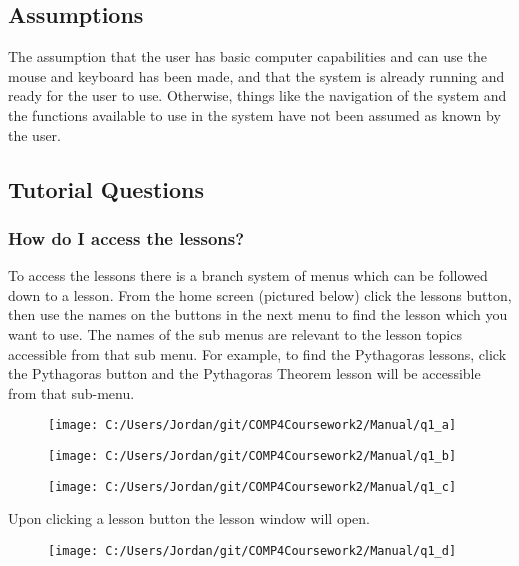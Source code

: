 \subsection{Assumptions}

The assumption that the user has basic computer capabilities and can use the mouse and keyboard has been made, and that the system is already running and ready for the user to use. Otherwise, things like the navigation of the system and the functions available to use in the system have not been assumed as known by the user.

\subsection{Tutorial Questions}

\subsubsection{How do I access the lessons?}

To access the lessons there is a branch system of menus which can be followed down to a lesson. From the home screen (pictured below) click the lessons button, then use the names on the buttons in the next menu to find the lesson which you want to use. The names of the sub menus are relevant to the lesson topics accessible from that sub menu. For example, to find the Pythagoras lessons, click the Pythagoras button and the Pythagoras Theorem lesson will be accessible from that sub-menu.

\begin{figure}[H]
    \texttt{[image: C:/Users/Jordan/git/COMP4Coursework2/Manual/q1\_a]}
\end{figure}

\begin{figure}[H]
    \texttt{[image: C:/Users/Jordan/git/COMP4Coursework2/Manual/q1\_b]}
\end{figure}

\begin{figure}[H]
    \texttt{[image: C:/Users/Jordan/git/COMP4Coursework2/Manual/q1\_c]}
\end{figure}

Upon clicking a lesson button the lesson window will open.

\begin{figure}[H]
    \texttt{[image: C:/Users/Jordan/git/COMP4Coursework2/Manual/q1\_d]}
\end{figure}


